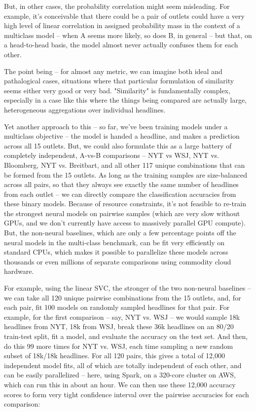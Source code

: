 \documentclass{scrartcl}
\begin{document}
But, in other cases, the probability correlation might seem misleading. For example, it's conceivable that there could be a pair of outlets could have a very high level of linear correlation in assigned probability mass in the context of a multiclass model -- when A seems more likely, so does B, in general -- but that, on a head-to-head basis, the model almost never actually confuses them for each other.

The point being -- for almost any metric, we can imagine both ideal and pathalogical cases, situations where that particular formulation of similarity seems either very good or very bad. "Similarity" is fundamentally complex, especially in a case like this where the things being compared are actually large, heterogeneous aggregations over individual headlines.

Yet another approach to this -- so far, we've been training models under a multiclass objective -- the model is handed a headline, and makes a prediction across all 15 outlets. But, we could also formulate this as a large battery of completely independent, A-vs-B comparisons -- NYT vs WSJ, NYT vs. Bloomberg, NYT vs. Breitbart, and all other 117 unique combinations that can be formed from the 15 outlets. As long as the training samples are size-balanced across all pairs, so that they always see exactly the same number of headlines from each outlet -- we can directly compare the classification accuracies from these binary models. Because of resource constraints, it's not feasible to re-train the strongest neural models on pairwise samples (which are very slow without GPUs, and we don't currently have access to massively parallel GPU compute). But, the non-neural baselines, which are only a few percentage points off the neural models in the multi-class benchmark, can be fit very efficiently on standard CPUs, which makes it possible to parallelize these models across thousands or even millions of separate comparisons using commodity cloud hardware.

For example, using the linear SVC, the stronger of the two non-neural baselines -- we can take all 120 unique pairwise combinations from the 15 outlets, and, for each pair, fit 100 models on randomly sampled headlines for that pair. For example, for the first comparison -- say, NYT vs. WSJ -- we would sample 18k headlines from NYT, 18k from WSJ, break these 36k headlines on an 80/20 train-test split, fit a model, and evaluate the accuracy on the test set. And then, do this 99 more times for NYT vs. WSJ, each time sampling a new random subset of 18k/18k headlines. For all 120 pairs, this gives a total of 12,000 independent model fits, all of which are totally independent of each other, and can be easily parallelized -- here, using Spark, on a 320-core cluster on AWS, which can run this in about an hour. We can then use these 12,000 accuracy scores to form very tight confidence interval over the pairwise accuracies for each comparison:
\end{document}
